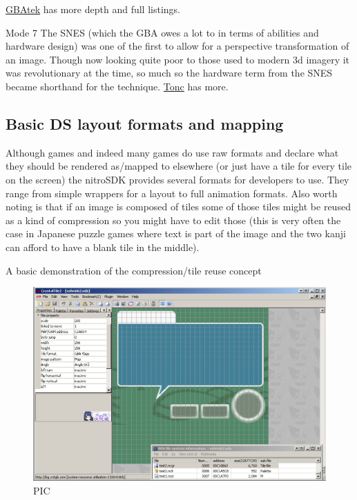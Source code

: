 \documentclass[
]{book}
\begin{document}
\href{http://problemkaputt.de/gbatek.htm\#lcdiocolorspecialeffects}{GBAtek} has more depth and full listings.

Mode 7 The SNES (which the GBA owes a lot to in terms of abilities and hardware design) was one of the first to allow for a perspective transformation of an image. Though now looking quite poor to those used to modern 3d imagery it was revolutionary at the time, so much so the hardware term from the SNES became shorthand for the technique. \href{http://www.coranac.com/tonc/text/mode7.htm}{Tonc} has more.

\hypertarget{basic-ds-layout-formats-and-mapping}{%
\subsection{Basic DS layout formats and mapping}\label{basic-ds-layout-formats-and-mapping}}

Although games and indeed many games do use raw formats and declare what they should be rendered as/mapped to elsewhere (or just have a tile for every tile on the screen) the nitroSDK provides several formats for developers to use. They range from simple wrappers for a layout to full animation formats. Also worth noting is that if an image is composed of tiles some of those tiles might be reused as a kind of compression so you might have to edit those (this is very often the case in Japanese puzzle games where text is part of the image and the two kanji can afford to have a blank tile in the middle).

A basic demonstration of the compression/tile reuse concept

\begin{figure}
\centering
\includegraphics{images/54_home_fast6191_romhackingguide_unrenamed_file___ginal_borders_3wizardozndsdemohack13jul2011.png}
\caption{PIC}
\end{figure}
\end{document}
